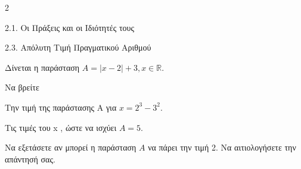 \begin{ylh}{2}
    \item 2.1. Οι Πράξεις και οι Ιδιότητές τους
    \item 2.3. Απόλυτη Τιμή Πραγματικού Αριθμού
\end{ylh}
Δίνεται η παράσταση $A = |x - 2| + 3, x \in \mathbb{R}$.

\begin{alist}
\item Να βρείτε

\begin{rlist}
\item Tην τιμή της παράστασης A για $x = 2^3 - 3^2$. 
\item Tις τιμές του x , ώστε να ισχύει $A = 5$. 
\end{rlist}
\item Να εξετάσετε αν μπορεί η παράσταση $A$ να πάρει την τιμή 2. Να αιτιολογήσετε την απάντησή σας.

\end{alist}

